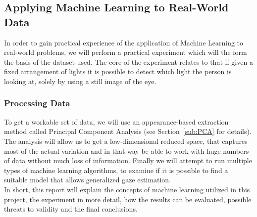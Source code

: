 \subsection{Applying Machine Learning to Real-World Data}
In order to gain practical experience of the application of Machine Learning to real-world problems, we will perform a practical experiment
which will the form the basis of the dataset used.
The core of the experiment relates to that if given a fixed arrangement of lights 
it is possible to detect which light the person is looking at, solely by using a still image of the eye.

\subsubsection{Processing Data}
To get a workable set of data, we will use an appearance-based extraction method called Principal Component Analysis (see Section~\ref{sub:PCA} for details).
The analysis will allow us to get a low-dimensional reduced space, that captures most of the actual variation and in that way
be able to work with huge numbers of data without much loss of information.
Finally we will attempt to run multiple types of machine learning algorithms,
to examine if it is possible to find a suitable model that allows generalized gaze estimation.  \\

In short, this report will explain the concepts of machine learning utilized in this project,
the experiment in more detail, how the results can be evaluated, possible threats to validity and the final conclusions.
